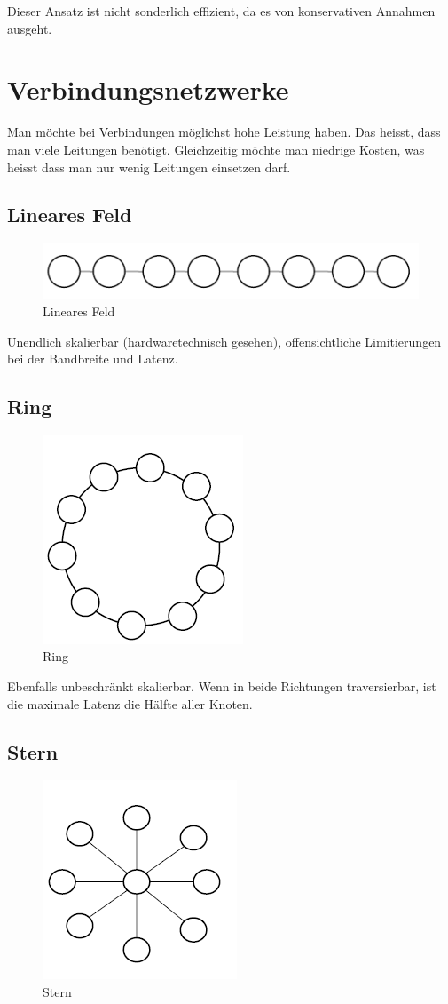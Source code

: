  Dieser Ansatz ist nicht sonderlich effizient, da es von konservativen Annahmen ausgeht.
 
\section{Verbindungsnetzwerke}
Man möchte bei Verbindungen möglichst hohe Leistung haben. Das heisst, dass man viele Leitungen benötigt. Gleichzeitig möchte man niedrige Kosten, was heisst dass man nur wenig Leitungen einsetzen darf.

\subsection{Lineares Feld}
\begin{figure}[h]
\centering
\includegraphics[width=0.7\linewidth]{fig/lineares_feld}
\caption{Lineares Feld}
\label{fig:lineares_feld}
\end{figure}

Unendlich skalierbar (hardwaretechnisch gesehen), offensichtliche Limitierungen bei der Bandbreite und Latenz.

\subsection{Ring}
\begin{figure}[h]
\centering
\includegraphics[width=0.2\linewidth]{fig/ring}
\caption{Ring}
\label{fig:ring}
\end{figure}

Ebenfalls unbeschränkt skalierbar. Wenn in beide Richtungen traversierbar, ist die maximale Latenz die Hälfte aller Knoten.

\subsection{Stern}
 \begin{figure}[h]
\centering
\includegraphics[width=0.2\linewidth]{fig/stern}
\caption{Stern}
\label{fig:stern}
\end{figure}

